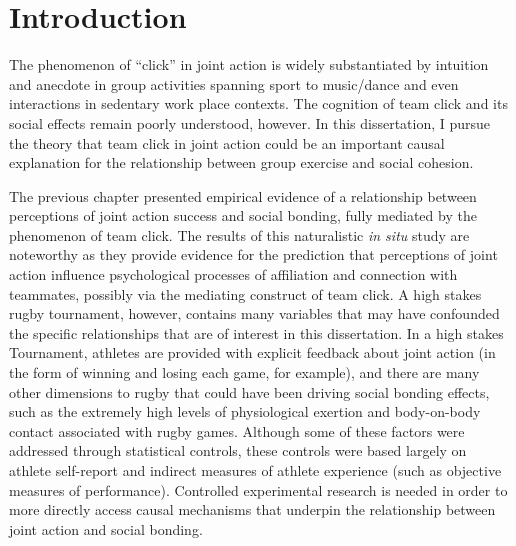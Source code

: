 
%


\section{Introduction}
The phenomenon of ``click'' in joint action is widely substantiated by intuition and anecdote in group activities spanning sport to music/dance and even interactions in sedentary work place contexts.  The cognition of team click and its social effects remain poorly understood, however.  In this dissertation, I pursue the theory that team click in joint action could be an important causal explanation for the relationship between group exercise and social cohesion.

The previous chapter presented empirical evidence of a relationship between perceptions of joint action success and social bonding, fully mediated by the phenomenon of team click.  The results of this naturalistic \textit{in situ} study are noteworthy as they provide evidence for the prediction that perceptions of joint action influence psychological processes of affiliation and connection with teammates, possibly via the mediating construct of team click.  A high stakes rugby tournament, however, contains many variables that may have confounded the specific relationships that are of interest in this dissertation. In a high stakes Tournament, athletes are provided with explicit feedback about joint action (in the form of winning and losing each game, for example), and there are many other dimensions to rugby that could have been driving social bonding effects, such as the extremely high levels of physiological exertion and body-on-body contact associated with rugby games.  Although some of these factors were addressed through statistical controls, these controls were based largely on athlete self-report and indirect measures of athlete experience (such as objective measures of performance).  Controlled experimental research is needed in order to more directly access causal mechanisms that underpin the relationship between joint action and social bonding.

